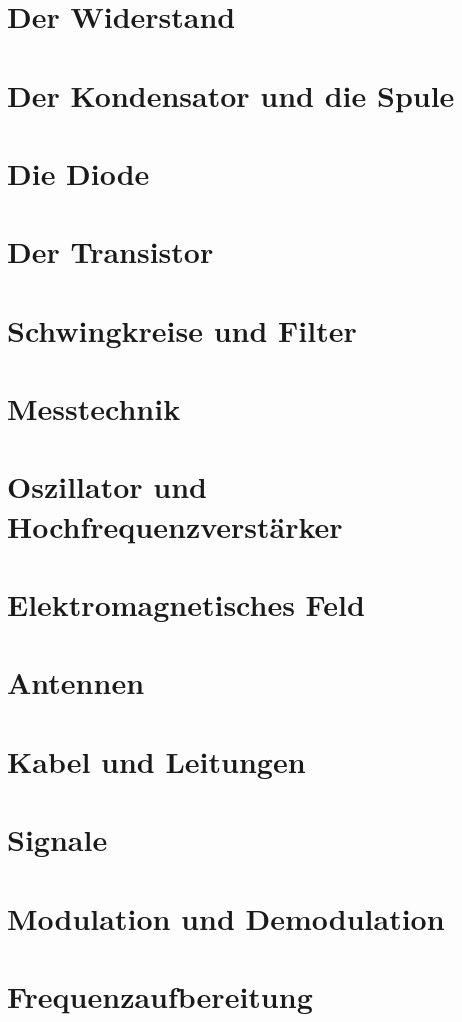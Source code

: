 \documentclass[ngerman,openany,twoside]{Script}
\begin{document}


\newpage


\chapter{Der Widerstand}


\chapter{Der Kondensator und die Spule}


\chapter{Die Diode}


\chapter{Der Transistor}


\chapter{Schwingkreise und Filter}


\chapter{Messtechnik}


\chapter{Oszillator und Hochfrequenzverstärker}


\chapter{Elektromagnetisches Feld}


\chapter{Antennen}


\chapter{Kabel und Leitungen}


\chapter{Signale}


\chapter{Modulation und Demodulation}


\chapter{Frequenzaufbereitung}




\end{document}
